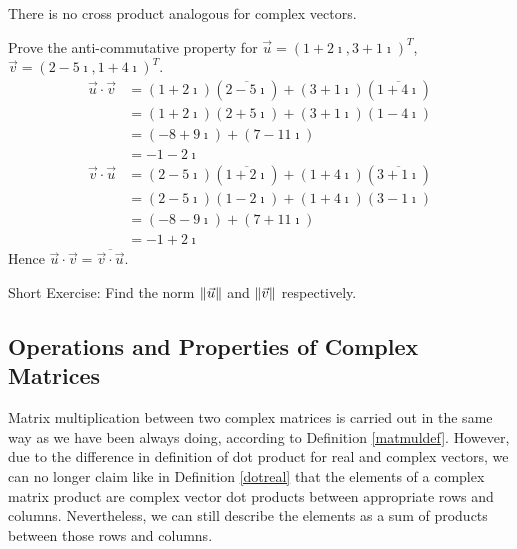 There is no cross product analogous for complex vectors.
\begin{exmp}
Prove the anti-commutative property for $\vec{u} = (1+2\imath, 3+1\imath)^T$, $\vec{v} = (2-5\imath, 1+4\imath)^T$.
\begin{align*}
\vec{u} \cdot \vec{v} &= (1+2\imath)(\overline{2-5\imath}) + (3+1\imath)(\overline{1+4\imath}) \\
&= (1+2\imath)(2+5\imath) + (3+1\imath)(1-4\imath) \\
&= (-8+9\imath) + (7-11\imath) \\
&= -1-2\imath 
\end{align*}
\begin{align*}
\vec{v} \cdot \vec{u} &= (2-5\imath)(\overline{1+2\imath}) + (1+4\imath)(\overline{3+1\imath}) \\
&= (2-5\imath)(1-2\imath) + (1+4\imath)(3-1\imath) \\
&= (-8-9\imath) + (7+11\imath) \\
&= -1+2\imath 
\end{align*}
Hence $\vec{u} \cdot \vec{v} = \overline{\vec{v} \cdot \vec{u}}$.
\end{exmp}
Short Exercise: Find the norm $\norm{\vec{u}}$ and $\norm{\vec{v}}$ respectively.

\subsection{Operations and Properties of Complex Matrices}
Matrix multiplication between two complex matrices is carried out in the same way as we have been always doing, according to Definition \ref{matmuldef}. However, due to the difference in definition of dot product for real and complex vectors, we can no longer claim like in Definition \ref{dotreal} that the elements of a complex matrix product are complex vector dot products between appropriate rows and columns. Nevertheless, we can still describe the elements as a sum of products between those rows and columns.

